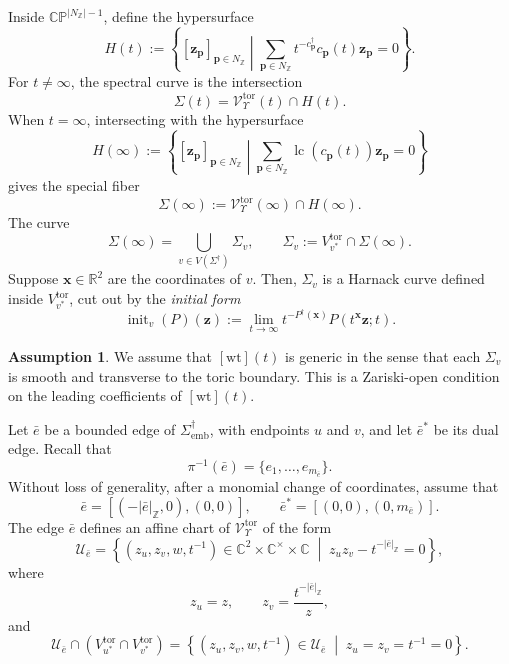 \documentclass[12pt]{amsart}
\numberwithin{equation}{section}
\theoremstyle{definition}
\newtheorem{assumption}[theorem]{Assumption}
\newcommand{\Z}{\mathbb{Z}}
\newcommand{\C}{\mathbb{C}}
\newcommand{\R}{\mathbb{R}}
\def\vertices{V}
\newcommand{\wt}{\mathrm{wt}}
\def\trop{\dagger}
\def\init{\operatorname{init}}
\def\lc{\operatorname{lc}}
\def\toricsurfacesmall{V^{\mathrm{tor}}}
\def\toricsurfacedegeneration{\mathcal V_\Subd^\mathrm{tor}}
\def\toricsurfacedegenerationfibert{\mathcal V_{\Subd}^\mathrm{tor}(t)}
\def\toricsurfacedegenerationfiberzero{\mathcal V_{\Subd}^\mathrm{tor}(\infty)}
\def\spectralcurve{\Sigma}
\def\degeneratecurve{\Sigma(\infty)}
\def\pt{{\bm{p}}} %
\def\ptR{{\bm{x}}} %
\def\ptC{{\bm{z}}} %
\def\NZ{N_{\Z}}
\def\hei{c^{\trop}}
\def\Subd{\Upsilon}
\def\mcurve{\Sigma}
\def\tropmcurve{\mcurve^\trop}
\begin{document}
Inside $\C\mathbb P^{|\NZ|-1}$, define the hypersurface
\[
H(t)
:=
\left\{
[\ptC_\pt]_{\pt\in\NZ}
\middle|
\sum_{\pt\in\NZ}
t^{-\hei_\pt}c_\pt(t)\ptC_\pt=0
\right\}.
\]
For $t\neq\infty$, the spectral curve is the intersection
\[
\spectralcurve(t)
=
\toricsurfacedegenerationfibert\cap H(t).
\]
When $t=\infty$, intersecting with the hypersurface
\[
H(\infty)
:=
\left\{
[\ptC_\pt]_{\pt\in\NZ}
\middle|
\sum_{\pt\in\NZ}
\lc(c_\pt(t))\ptC_\pt=0
\right\}
\]
gives the special fiber
\[
\degeneratecurve
:=
\toricsurfacedegenerationfiberzero\cap H(\infty).
\]
The curve
\[
\degeneratecurve
=
\bigcup_{v\in\vertices(\tropmcurve)}
\spectralcurve_v,
\qquad
\spectralcurve_v
:=
\toricsurfacesmall_{v^*}\cap\degeneratecurve.
\]
Suppose $\ptR\in\R^2$ are the coordinates of $v$. Then,
$\spectralcurve_v$ is a Harnack curve defined inside
$\toricsurfacesmall_{v^*}$, cut out by the \emph{initial form}
\[
\init_v(P)(\ptC)
:=
\lim_{t\to\infty}
t^{-P^\trop(\ptR)}
P(t^\ptR\ptC;t).
\]

\begin{assumption}
\label{ass:generic-leading-coefficients}
We assume that $[\wt](t)$ is generic in the sense that each
$\spectralcurve_v$ is smooth and transverse to the toric boundary. This is a Zariski-open condition on the leading coefficients of
$[\wt](t)$.
\end{assumption}



Let $\bar e$ be a bounded edge of
$\tropmcurve_{\mathrm{emb}}$, with endpoints $u$ and $v$, and let
$\bar e^*$ be its dual edge. Recall that
\[
\pi^{-1}(\bar e)
=
\{e_1,\dots,e_{m_{\bar e}}\}.
\]
Without loss of generality, after a monomial change of coordinates,
assume that
\[
\bar e=[(-|\bar e|_{\Z},0),(0,0)],
\qquad
\bar e^*=[(0,0),(0,m_{\bar e})].
\]
The edge $\bar e$ defines an affine chart of
$\toricsurfacedegeneration$ of the form
\[
\mathcal U_{\bar e}
=
\left\{
(z_u,z_v,w,t^{-1})
\in
\C^2\times\C^\times\times\C
\;\middle|\;
z_uz_v-t^{-|\bar e|_{\Z}}=0
\right\},
\]
where
\[
z_u=z,
\qquad
z_v=\frac{t^{-|\bar e|_{\Z}}}{z},
\]
and
\begin{equation}
\mathcal U_{\bar e}
\cap
\left(
\toricsurfacesmall_{u^*}
\cap
\toricsurfacesmall_{v^*}
\right)
=
\left\{
(z_u,z_v,w,t^{-1})\in\mathcal U_{\bar e}
\;\middle|\;
z_u=z_v=t^{-1}=0
\right\}.
\label{eq:line_of_intersection}
\end{equation}
\end{document}
